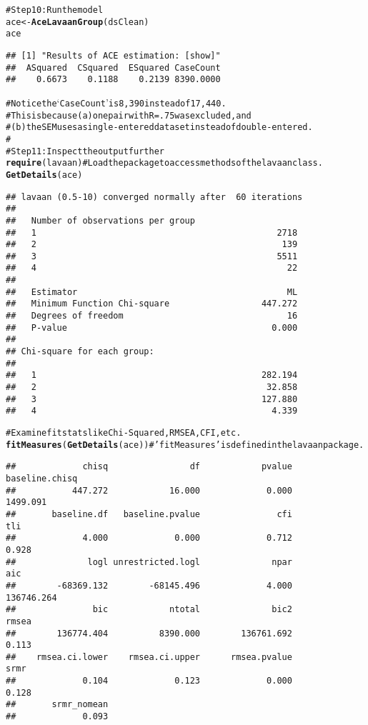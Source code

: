 \documentclass[letterpaper]{article}\usepackage{graphicx, color}
\makeatletter
\newcommand{\hlfunctioncall}[1]{\textcolor[rgb]{0.501960784313725,0,0.329411764705882}{\textbf{#1}}}%
\newcommand{\hlstring}[1]{\textcolor[rgb]{0.6,0.6,1}{#1}}%
\newcommand{\hlcomment}[1]{\textcolor[rgb]{0.180392156862745,0.6,0.341176470588235}{#1}}%
\newenvironment{kframe}{%
 \def\at@end@of@kframe{}%
 \ifinner\ifhmode%
  \def\at@end@of@kframe{\end{minipage}}%
  \begin{minipage}{\columnwidth}%
 \fi\fi%
 \def\FrameCommand##1{\hskip\@totalleftmargin \hskip-\fboxsep
 \colorbox{shadecolor}{##1}\hskip-\fboxsep
     \hskip-\linewidth \hskip-\@totalleftmargin \hskip\columnwidth}%
 \MakeFramed {\advance\hsize-\width
   \@totalleftmargin\z@ \linewidth\hsize
   \@setminipage}}%
 {\par\unskip\endMakeFramed%
 \at@end@of@kframe}
\newenvironment{knitrout}{}{} %
\makeatother
\begin{document}
\begin{knitrout}
\begin{kframe}
\begin{alltt}
\hlcomment{#Step 10: Run the model}
ace <- \hlfunctioncall{AceLavaanGroup}(dsClean)
ace
\end{alltt}
\begin{verbatim}
## [1] "Results of ACE estimation: [show]"
##  ASquared  CSquared  ESquared CaseCount 
##    0.6673    0.1188    0.2139 8390.0000
\end{verbatim}
\begin{alltt}
\hlcomment{#Notice the `CaseCount' is 8,390 instead of 17,440.}
\hlcomment{#  This is because (a) one pair with R=.75 was excluded, and}
\hlcomment{#  (b) the SEM uses a single-entered dataset instead of double-entered.}
\hlcomment{#}
\hlcomment{#Step 11: Inspect the output further}
\hlfunctioncall{require}(lavaan) \hlcomment{#Load the package to access methods of the lavaan class.}
\hlfunctioncall{GetDetails}(ace)
\end{alltt}
\begin{verbatim}
## lavaan (0.5-10) converged normally after  60 iterations
## 
##   Number of observations per group         
##   1                                               2718
##   2                                                139
##   3                                               5511
##   4                                                 22
## 
##   Estimator                                         ML
##   Minimum Function Chi-square                  447.272
##   Degrees of freedom                                16
##   P-value                                        0.000
## 
## Chi-square for each group:
## 
##   1                                            282.194
##   2                                             32.858
##   3                                            127.880
##   4                                              4.339
\end{verbatim}
\begin{alltt}
\hlcomment{#Examine fit stats like Chi-Squared, RMSEA, CFI, etc.}
\hlfunctioncall{fitMeasures}(\hlfunctioncall{GetDetails}(ace)) \hlcomment{#\hlstring{'fitMeasures'} is defined in the lavaan package.}
\end{alltt}
\begin{verbatim}
##             chisq                df            pvalue    baseline.chisq 
##           447.272            16.000             0.000          1499.091 
##       baseline.df   baseline.pvalue               cfi               tli 
##             4.000             0.000             0.712             0.928 
##              logl unrestricted.logl              npar               aic 
##        -68369.132        -68145.496             4.000        136746.264 
##               bic            ntotal              bic2             rmsea 
##        136774.404          8390.000        136761.692             0.113 
##    rmsea.ci.lower    rmsea.ci.upper      rmsea.pvalue              srmr 
##             0.104             0.123             0.000             0.128 
##       srmr_nomean 
##             0.093
\end{verbatim}
\begin{alltt}


\end{alltt}
\end{kframe}
\end{knitrout}
\end{document}
